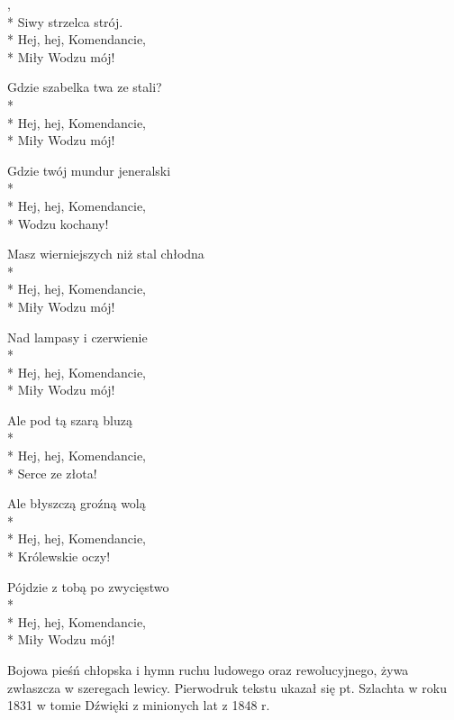 \begin{lyrics}[longestline={Masz wierniejszych niż stal chłodna}]

,\\*
Siwy strzelca strój.\\*
Hej, hej, Komendancie,\\*
Miły Wodzu mój!

Gdzie szabelka twa ze stali?\\*
\\*
Hej, hej, Komendancie,\\*
Miły Wodzu mój!

Gdzie twój mundur jeneralski\\*
\\*
Hej, hej, Komendancie,\\*
Wodzu kochany!

Masz wierniejszych niż stal chłodna\\*
\\*
Hej, hej, Komendancie,\\*
Miły Wodzu mój!

Nad lampasy i czerwienie\\*
\\*
Hej, hej, Komendancie,\\*
Miły Wodzu mój!

Ale pod tą szarą bluzą\\*
\\*
Hej, hej, Komendancie,\\*
Serce ze złota!

Ale błyszczą groźną wolą\\*
\\*
Hej, hej, Komendancie,\\*
Królewskie oczy!

Pójdzie z tobą po zwycięstwo\\*
\\*
Hej, hej, Komendancie,\\*
Miły Wodzu mój!
\end{lyrics}



\begin{info}Bojowa pieśń chłopska i hymn ruchu ludowego oraz rewolucyjnego, żywa zwłaszcza w szeregach lewicy. Pierwodruk tekstu ukazał się pt. Szlachta w roku 1831 w tomie Dźwięki z minionych lat z 1848 r.\end{info}

